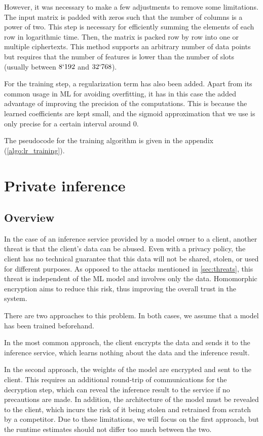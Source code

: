\documentclass[a4paper,11pt,oneside]{report}
\begin{document}
However, it was necessary to make a few adjustments to remove some limitations. 
The input matrix is padded with zeros such that the number of columns is a power of two. 
This step is necessary for efficiently summing the elements of each row in logarithmic time. 
Then, the matrix is packed row by row into one or multiple ciphertexts. 
This method supports an arbitrary number of data points but requires that the number of features is lower than the number of slots (usually between $8`192$ and $32`768$). 

For the training step, a regularization term has also been added. 
Apart from its common usage in ML for avoiding overfitting, it has in this case the added advantage of improving the precision of the computations. 
This is because the learned coefficients are kept small, and the sigmoid approximation that we use is only precise for a certain interval around $0$.

The pseudocode for the training algorithm is given in the appendix (\autoref{algo:lr_training}).


\section{Private inference}\label{sec:private_inference}

\subsection{Overview}

In the case of an inference service provided by a model owner to a client, another threat is that the client's data can be abused. 
Even with a privacy policy, the client has no technical guarantee that this data will not be shared, stolen, or used for different purposes. 
As opposed to the attacks mentioned in \autoref{sec:threats}, this threat is independent of the ML model and involves only the data. 
Homomorphic encryption aims to reduce this risk, thus improving the overall trust in the system.

There are two approaches to this problem. 
In both cases, we assume that a model has been trained beforehand. 

In the most common approach, the client encrypts the data and sends it to the inference service, which learns nothing about the data and the inference result.

In the second approach, the weights of the model are encrypted and sent to the client. 
This requires an additional round-trip of communications for the decryption step, which can reveal the inference result to the service if no precautions are made. 
In addition, the architecture of the model must be revealed to the client, which incurs the risk of it being stolen and retrained from scratch by a competitor. 
Due to these limitations, we will focus on the first approach, but the runtime estimates should not differ too much between the two.
\end{document}
